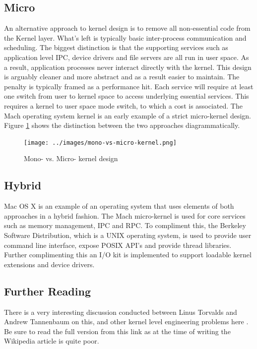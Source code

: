 \documentclass[10pt,a4paper]{article}
\begin{document}
\subsection{Micro}
An alternative approach to kernel design is to remove all non-essential code from the Kernel layer. What's left is typically basic inter-process communication and scheduling. The biggest distinction is that the supporting services such as application level IPC, device drivers and file servers are all run in user space. As a result, application processes never interact directly with the kernel. This design is arguably cleaner and more abstract and as a result easier to maintain. The penalty is typically framed as a performance hit. Each service will require at least one switch from user to kernel space to access underlying essential services. This requires a kernel to user space mode switch, to which a cost is associated. The Mach operating system kernel is an early example of a strict micro-kernel design. Figure \ref{monomicro} shows the distinction between the two approaches diagrammatically. 
\begin{figure}
\caption{Mono- vs. Micro- kernel design}
\begin{center}
\texttt{[image: ../images/mono-vs-micro-kernel.png]}
\label{monomicro}
\end{center}
\end{figure}
\subsection{Hybrid}
Mac OS X is an example of an operating system that uses elements of both approaches in a hybrid fashion. The Mach micro-kernel is used for core services such as memory management, IPC and RPC. To compliment this, the Berkeley Software Distribution, which is a UNIX operating system, is used to provide user command line interface, expose POSIX API's and provide thread libraries. Further complimenting this an I/O kit is implemented to support loadable kernel extensions and device drivers.  
\subsection{Further Reading}
There is a very interesting discussion conducted between Linus Torvalds and Andrew Tannenbaum on this, and other kernel level engineering problems here \cite{LINUSTANNEN}. Be sure to read the full version from this link as at the time of writing the Wikipedia article is quite poor. 
\end{document}
